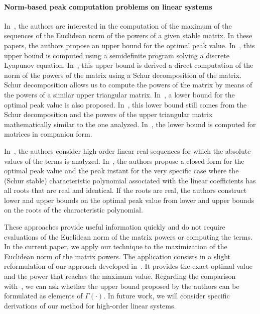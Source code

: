 \documentclass{article}
\def\funset{\Gamma}
\def\blue#1{#1}
\begin{document}
\paragraph{Norm-based peak computation problems on linear systems}
\blue{
In~\cite{ahiyevich2018upper,dowler2013bounding,7984147}, the authors are interested in the computation of the maximum of the sequences of the Euclidean norm of the powers of a given stable matrix. In these papers, the authors propose an upper bound for the optimal peak value. In~\cite{ahiyevich2018upper,7984147}, this upper bound is computed using a semidefinite program solving a discrete Lyapunov equation. In~\cite{dowler2013bounding}, this upper bound is derived a direct computation of the norm of the powers of the matrix using a Schur decomposition of the matrix. Schur decomposition allows us to compute the powers of the matrix by means of the powers of a similar upper triangular matrix. In~\cite{dowler2013bounding,7984147}, a lower bound for the optimal peak value is also proposed. In~\cite{dowler2013bounding}, this lower bound still comes from the Schur decomposition and the powers of the upper triangular matrix mathematically similar to the one analyzed. In~\cite{7984147}, the lower bound is computed for matrices in companion form.
}

\blue{
In~\cite{polyak2018peak}, the authors consider high-order linear real sequences for which the absolute values of the terms is analyzed. In~\cite{polyak2018peak}, the authors propose a closed form for the optimal peak value and the peak instant for the very specific case where the (Schur stable) characteristic polynomial associated with the linear coefficients has all roots that are real and identical. If the roots are real, the authors construct lower and upper bounds on the optimal peak value from lower and upper bounds on the roots of the characteristic polynomial.
}

\blue{
These approaches provide useful information quickly and do not require evaluations of the Euclidean norm of the matrix powers or computing the terms. In the current paper, we apply our technique to the maximization of the Euclidean norm of the matrix powers. The application consists in a slight reformulation of our approach developed in~\cite{adje13052025}. It provides the exact optimal value and the power that reaches the maximum value. Regarding the comparison with~\cite{polyak2018peak}, we can ask whether the upper bound proposed by the authors can be formulated as elements of $\funset(\cdot)$. In future work, we will consider specific derivations of our method for high-order linear systems. 
}
\end{document}

